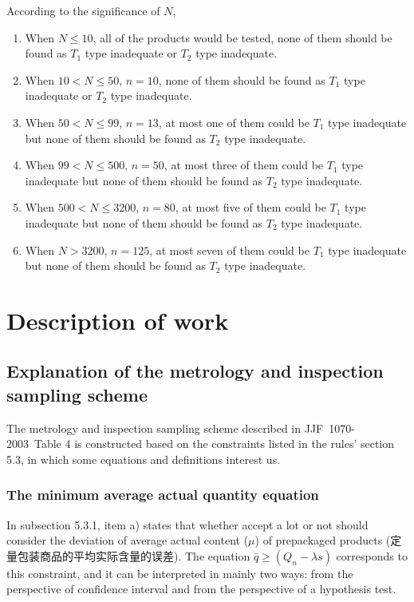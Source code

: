\documentclass[conf]{new-aiaa}
\begin{document}
According to the significance of $N$,
\begin{enumerate}
    \item When $N \leqslant 10$, all of the products would be tested, none of them should be found as $T_1$ type inadequate or $T_2$ type inadequate.
    \item When $10 < N \leqslant 50$, $n = 10$, none of them should be found as $T_1$ type inadequate or $T_2$ type inadequate.
    \item When $50 < N \leqslant 99$, $n = 13$, at most one of them could be $T_1$ type inadequate but none of them should be found as $T_2$ type inadequate.
    \item When $99 < N \leqslant 500$, $n = 50$, at most three of them could be $T_1$ type inadequate but none of them should be found as $T_2$ type inadequate.
    \item When $500 < N \leqslant 3200$, $n = 80$, at most five of them could be $T_1$ type inadequate but none of them should be found as $T_2$ type inadequate.
    \item When $N > 3200 $, $n = 125$, at most seven of them could be $T_1$ type inadequate but none of them should be found as $T_2$ type inadequate.
\end{enumerate}

\newpage

\section{Description of work}

\subsection{Explanation of the metrology and inspection sampling scheme}

The metrology and inspection sampling scheme described in JJF\ 1070-2003\ Table 4 is constructed based on the constraints listed in the rules' section 5.3, in which some equations and definitions interest us.

\subsubsection{The minimum average actual quantity equation}
\label{ans1}

In subsection 5.3.1, item a) states that whether accept a lot or not should consider the deviation of average actual content ($\mu$) of prepackaged products (定量包装商品的平均实际含量的误差). The equation $\bar{q} \geqslant (Q_n - \lambda s)$ corresponds to this constraint, and it can be interpreted in mainly two ways: from the perspective of confidence interval and from the perspective of a hypothesis test. \medskip
\end{document}

